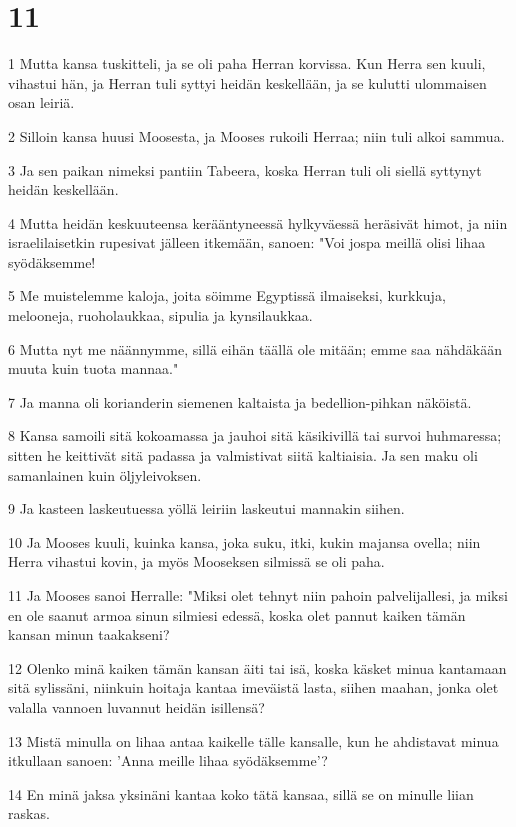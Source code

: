 \chapter{11}

\par 1 Mutta kansa tuskitteli, ja se oli paha Herran korvissa. Kun Herra sen kuuli, vihastui hän, ja Herran tuli syttyi heidän keskellään, ja se kulutti ulommaisen osan leiriä.
\par 2 Silloin kansa huusi Moosesta, ja Mooses rukoili Herraa; niin tuli alkoi sammua.
\par 3 Ja sen paikan nimeksi pantiin Tabeera, koska Herran tuli oli siellä syttynyt heidän keskellään.
\par 4 Mutta heidän keskuuteensa kerääntyneessä hylkyväessä heräsivät himot, ja niin israelilaisetkin rupesivat jälleen itkemään, sanoen: "Voi jospa meillä olisi lihaa syödäksemme!
\par 5 Me muistelemme kaloja, joita söimme Egyptissä ilmaiseksi, kurkkuja, melooneja, ruoholaukkaa, sipulia ja kynsilaukkaa.
\par 6 Mutta nyt me näännymme, sillä eihän täällä ole mitään; emme saa nähdäkään muuta kuin tuota mannaa."
\par 7 Ja manna oli korianderin siemenen kaltaista ja bedellion-pihkan näköistä.
\par 8 Kansa samoili sitä kokoamassa ja jauhoi sitä käsikivillä tai survoi huhmaressa; sitten he keittivät sitä padassa ja valmistivat siitä kaltiaisia. Ja sen maku oli samanlainen kuin öljyleivoksen.
\par 9 Ja kasteen laskeutuessa yöllä leiriin laskeutui mannakin siihen.
\par 10 Ja Mooses kuuli, kuinka kansa, joka suku, itki, kukin majansa ovella; niin Herra vihastui kovin, ja myös Mooseksen silmissä se oli paha.
\par 11 Ja Mooses sanoi Herralle: "Miksi olet tehnyt niin pahoin palvelijallesi, ja miksi en ole saanut armoa sinun silmiesi edessä, koska olet pannut kaiken tämän kansan minun taakakseni?
\par 12 Olenko minä kaiken tämän kansan äiti tai isä, koska käsket minua kantamaan sitä sylissäni, niinkuin hoitaja kantaa imeväistä lasta, siihen maahan, jonka olet valalla vannoen luvannut heidän isillensä?
\par 13 Mistä minulla on lihaa antaa kaikelle tälle kansalle, kun he ahdistavat minua itkullaan sanoen: 'Anna meille lihaa syödäksemme'?
\par 14 En minä jaksa yksinäni kantaa koko tätä kansaa, sillä se on minulle liian raskas.
